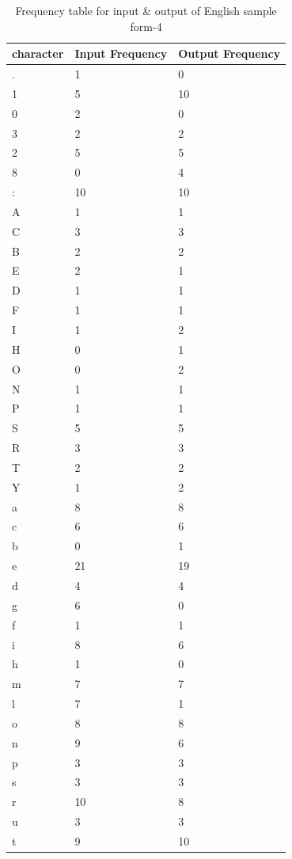 \begin{table}[H]
\centering
\begin{tabular}{|p{2cm}|p{2cm}|p{2cm}|}
\hline
character & Input Frequency & Output Frequency \\
\hline
. & 1 & 0\\
\hline
1 & 5 & 10\\
\hline
0 & 2 & 0\\
\hline
3 & 2 & 2\\
\hline
2 & 5 & 5\\
\hline
8 & 0 & 4\\
\hline
: & 10 & 10\\
\hline
A & 1 & 1\\
\hline
C & 3 & 3\\
\hline
B & 2 & 2\\
\hline
E & 2 & 1\\
\hline
D & 1 & 1\\
\hline
F & 1 & 1\\
\hline
I & 1 & 2\\
\hline
H & 0 & 1\\
\hline
O & 0 & 2\\
\hline
N & 1 & 1\\
\hline
P & 1 & 1\\
\hline
S & 5 & 5\\
\hline
R & 3 & 3\\
\hline
T & 2 & 2\\
\hline
Y & 1 & 2\\
\hline
a & 8 & 8\\
\hline
c & 6 & 6\\
\hline
b & 0 & 1\\
\hline
e & 21 & 19\\
\hline
d & 4 & 4\\
\hline
g & 6 & 0\\
\hline
f & 1 & 1\\
\hline
i & 8 & 6\\
\hline
h & 1 & 0\\
\hline
m & 7 & 7\\
\hline
l & 7 & 1\\
\hline
o & 8 & 8\\
\hline
n & 9 & 6\\
\hline
p & 3 & 3\\
\hline
s & 3 & 3\\
\hline
r & 10 & 8\\
\hline
u & 3 & 3\\
\hline
t & 9 & 10\\
\hline
\end{tabular}
\caption {Frequency table for input \& output of English sample form-4}
\label {tab:Table4}
\end{table}

